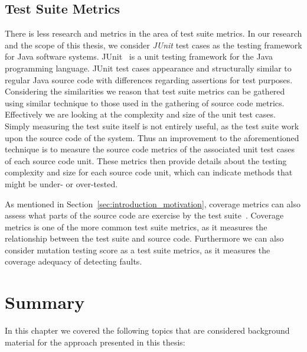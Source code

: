 \subsection{Test Suite Metrics}
\label{subsec:background_test_suite_metrics}
There is less research and metrics in the area of test suite metrics. In our research and the scope of this thesis, we consider \emph{JUnit} test cases as the testing framework for Java software systems. JUnit~\cite{JUnit} is a unit testing framework for the Java programming language. JUnit test cases appearance and structurally similar to regular Java source code with differences regarding assertions for test purposes. Considering the similarities we reason that test suite metrics can be gathered using similar technique to those used in the gathering of source code metrics. Effectively we are looking at the complexity and size of the unit test cases. Simply measuring the test suite itself is not entirely useful, as the test suite work upon the source code of the system. Thus an improvement to the aforementioned technique is to measure the source code metrics of the associated unit test cases of each source code unit. These metrics then provide details about the testing complexity and size for each source code unit, which can indicate methods that might be under- or over-tested.

As mentioned in Section~\ref{sec:introduction_motivation}, coverage metrics can also assess what parts of the source code are exercise by the test suite~\cite{ZHM97}. Coverage metrics is one of the more common test suite metrics, as it measures the relationship between the test suite and source code. Furthermore we can also consider mutation testing score as a test suite metrics, as it measures the coverage adequacy of detecting faults.



\section{Summary}
\label{sec:background_summary}
In this chapter we covered the following topics that are considered background material for the approach presented in this thesis:

